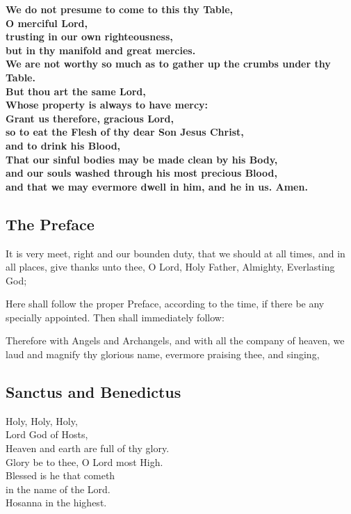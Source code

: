 
\textbf{We do not presume to come to this thy Table,\\
O merciful Lord,\\
trusting in our own righteousness,\\
but in thy manifold and great mercies.\\
We are not worthy so much as to gather up the crumbs under thy Table.\\
But thou art the same Lord,\\
Whose property is always to have mercy:\\
Grant us therefore, gracious Lord,\\
so to eat the Flesh of thy dear Son Jesus Christ,\\
and to drink his Blood,\\
That our sinful bodies may be made clean by his Body,\\
and our souls washed through his most precious Blood,\\
and that we may evermore dwell in him, and he in us. Amen.}

\subsection{The Preface}


It is very meet, right and our bounden duty, that we should at all times, and in
all places, give thanks unto thee, O Lord, Holy Father, Almighty, Everlasting God;

\newpage

\begin{rubric}
Here shall follow the proper Preface, according to the time, if there be any specially appointed.
Then shall immediately follow:
\end{rubric}

Therefore with Angels and Archangels, and with all the company of heaven,
we laud and magnify thy glorious name, evermore praising thee, and singing,

\subsection{Sanctus and Benedictus}

Holy, Holy, Holy,\\
Lord God of Hosts,\\
Heaven and earth are full of thy glory.\\
Glory be to thee, O Lord most High.\\
\cross Blessed is he that cometh\\
in the name of the Lord.\\
Hosanna in the highest.


